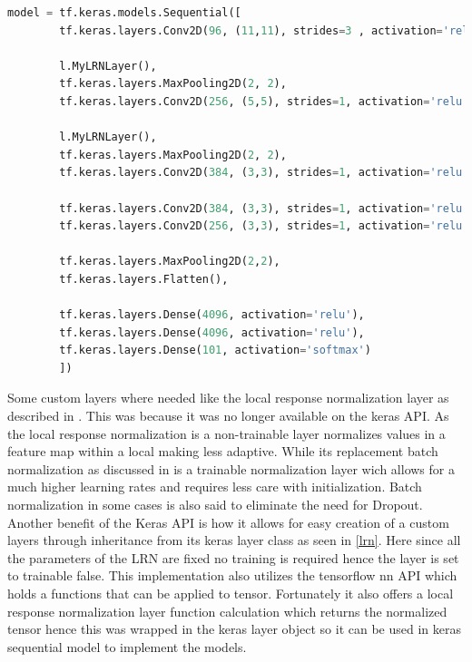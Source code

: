 \documentclass[10pt,phd,a4paper,oneside]{article}
\begin{document}
    \begin{lstlisting}[language=Python, caption=Single Frame model implemetation, label=singleFrame]
        model = tf.keras.models.Sequential([
        tf.keras.layers.Conv2D(96, (11,11), strides=3 , activation='relu', input_shape=(170, 170, 3)),

        l.MyLRNLayer(),
        tf.keras.layers.MaxPooling2D(2, 2),
        tf.keras.layers.Conv2D(256, (5,5), strides=1, activation='relu'),

        l.MyLRNLayer(),
        tf.keras.layers.MaxPooling2D(2, 2),
        tf.keras.layers.Conv2D(384, (3,3), strides=1, activation='relu'),

        tf.keras.layers.Conv2D(384, (3,3), strides=1, activation='relu'),
        tf.keras.layers.Conv2D(256, (3,3), strides=1, activation='relu'),

        tf.keras.layers.MaxPooling2D(2,2),
        tf.keras.layers.Flatten(),

        tf.keras.layers.Dense(4096, activation='relu'),
        tf.keras.layers.Dense(4096, activation='relu'),
        tf.keras.layers.Dense(101, activation='softmax')
        ])
    \end{lstlisting}

    Some custom layers where needed like the local response normalization layer as described in \citep{NIPS2012_4824}. This was because it was no longer available on the keras API. As the local response normalization is a non-trainable layer normalizes values in a feature map within a local making less adaptive. While its replacement batch normalization as discussed in \citep{ioffe2015batch} is a trainable normalization layer wich allows for a much higher learning rates and requires less care with initialization. Batch normalization in some cases is also said to eliminate the need for Dropout.
    Another benefit of the Keras API is how it allows for easy creation of a custom layers through inheritance from its keras layer class as seen in \ref{lrn}. Here since all the parameters of the LRN are fixed no training is required hence the layer is set to trainable false.
    This implementation also utilizes the tensorflow nn API which holds a functions that can be applied to tensor. Fortunately it also offers a local response normalization layer function calculation which returns the normalized tensor hence this was wrapped in the keras layer object so it can be used in  keras sequential model to implement the models.
\end{document}

